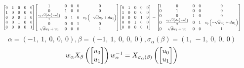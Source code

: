 \documentclass[11pt]{article}
\theoremstyle{definition}
\begin{document}
\[
\scaletoalign{\textwidth}{{\left[\begin{matrix}0 & 1 & 0 & 0 & 0\\1 & 0 & 0 & 0 & 0\\0 & 0 & 0 & 1 & 0\\0 & 0 & 1 & 0 & 0\\0 & 0 & 0 & 0 & 1\end{matrix}\right]} {\left[\begin{matrix}1 & 0 & 0 & 0 & 0\\0 & 1 & 0 & 0 & 0\\\frac{c_{0} \sqrt{d} \left(d u_{1}^{2} - u_{0}^{2}\right)}{2} & 0 & 1 & 0 & c_{0} \left(- \sqrt{d} u_{0} + d u_{1}\right)\\0 & 0 & 0 & 1 & 0\\\sqrt{d} u_{1} + u_{0} & 0 & 0 & 0 & 1\end{matrix}\right]} {\left[\begin{matrix}0 & 1 & 0 & 0 & 0\\1 & 0 & 0 & 0 & 0\\0 & 0 & 0 & 1 & 0\\0 & 0 & 1 & 0 & 0\\0 & 0 & 0 & 0 & 1\end{matrix}\right]} = {\left[\begin{matrix}1 & 0 & 0 & 0 & 0\\0 & 1 & 0 & 0 & 0\\0 & 0 & 1 & 0 & 0\\0 & \frac{c_{0} \sqrt{d} \left(d u_{1}^{2} - u_{0}^{2}\right)}{2} & 0 & 1 & c_{0} \left(- \sqrt{d} u_{0} + d u_{1}\right)\\0 & \sqrt{d} u_{1} + u_{0} & 0 & 0 & 1\end{matrix}\right]}}
\]
\[
\alpha = \left( -1, \  1, \  0, \  0, \  0\right), \beta = \left( -1, \  1, \  0, \  0, \  0\right), \sigma_{\alpha}(\beta) = \left( 1, \  -1, \  0, \  0, \  0\right)
\]
\[
\scaletoalign{\textwidth}{w_{\alpha} X_{\beta}\left(\left[\begin{matrix}u_{0}\\u_{1}\end{matrix}\right]\right) w_{\alpha}^{-1} = X_{\sigma_{\alpha}\left(\beta\right)}\left(\left[\begin{matrix}u_{0}\\u_{1}\end{matrix}\right]\right)}
\]
\end{document}
